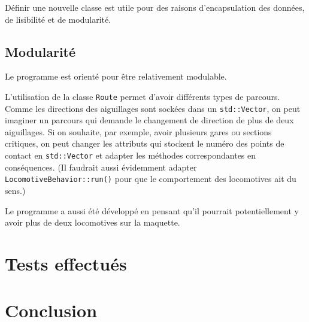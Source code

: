 \documentclass{article}
\begin{document}
Définir une nouvelle classe est utile pour des raisons d'encapsulation des données, de lisibilité et de modularité.

\subsection*{Modularité}
Le programme est orienté pour être relativement modulable.

L'utilisation de la classe \texttt{Route} permet d'avoir différents types de parcours. Comme les directions des aiguillages
sont sockées dans un \texttt{std::Vector}, on peut imaginer un parcours qui demande le changement de direction de plus de 
deux aiguillages. Si on souhaite, par exemple, avoir plusieurs gares ou sections critiques, on peut changer les attributs qui stockent
le numéro des points de contact en \texttt{std::Vector} et adapter les méthodes correspondantes en conséquences. (Il faudrait aussi 
évidemment adapter \texttt{LocomotiveBehavior::run()} pour que le comportement des locomotives ait du sens.)

Le programme a aussi été développé en pensant qu'il pourrait potentiellement y avoir plus de deux locomotives sur la maquette. 

\section*{Tests effectués}
\noindent

\section*{Conclusion}
\noindent
\end{document}
